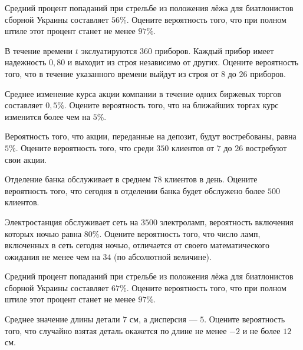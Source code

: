 \vfill

\newpage\setcounter{zad}{0}

\z Средний процент попаданий при стрельбе из положения лёжа для биатлонистов сборной Украины составляет $ 56 \% $. Оцените вероятность того, что при полном штиле этот процент станет не менее $ 97 \% $.


\vfill

\z В течение времени $t$ экслуатируются $ 360 $ приборов. Каждый прибор имеет надежность $ 0{,}80 $ и выходит из строя независимо от других. Оцените вероятность того, что в течение указанного времени выйдут из строя от $ 8 $ до $ 26 $ приборов.
 

\vfill

\newpage\setcounter{zad}{0}

\z Среднее изменение курса акции компании в течение одних биржевых торгов составляет $ 0{,}5 \% $. Оцените вероятность того, что на ближайших торгах курс изменится более чем на $ 5 \% $.


\vfill

\z Вероятность того, что акции, переданные на депозит, будут востребованы, равна $ 5 \% $. Оцените вероятность того, что среди $ 350 $ клиентов от $ 7 $ до $ 26 $ востребуют свои акции.
 

\vfill

\newpage\setcounter{zad}{0}

\z Отделение банка обслуживает в среднем $ 78 $ клиентов в день. Оцените вероятность того, что сегодня в отделении банка будет обслужено более $ 500 $ клиентов.


\vfill

\z Электростанция обслуживает сеть на $ 3500 $ электроламп, вероятность включения которых ночью равна $ 80 \% $. Оцените вероятность того, что число ламп, включенных в сеть сегодня ночью, отличается от своего математического ожидания не менее чем на $ 34 $ (по абсолютной величине). 
 

\vfill

\newpage\setcounter{zad}{0}

\z Средний процент попаданий при стрельбе из положения лёжа для биатлонистов сборной Украины составляет $ 67 \% $. Оцените вероятность того, что при полном штиле этот процент станет не менее $ 97 \% $.


\vfill

\z Среднее значение длины детали $ 7 $ см, а дисперсия --- $ 5 $. Оцените вероятность того, что случайно взятая деталь окажется по длине не менее $ -2 $ и не более $ 12 $ см.
 

